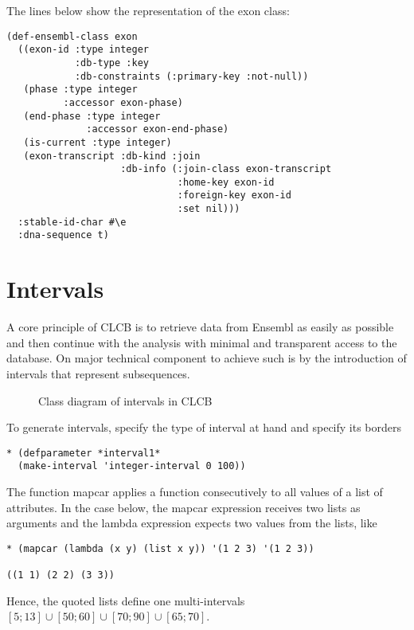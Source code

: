 \documentclass{book}
\newcommand\CLCB{CLCB }
\begin{document}
The lines below show the representation of the exon class:
\begin{lstlisting}
(def-ensembl-class exon
  ((exon-id :type integer
            :db-type :key
            :db-constraints (:primary-key :not-null))
   (phase :type integer
          :accessor exon-phase)
   (end-phase :type integer
              :accessor exon-end-phase)
   (is-current :type integer)
   (exon-transcript :db-kind :join
                    :db-info (:join-class exon-transcript
                              :home-key exon-id
                              :foreign-key exon-id
                              :set nil)))
  :stable-id-char #\e
  :dna-sequence t)
\end{lstlisting}

\section{Intervals}

A core principle of \CLCB is to retrieve data from Ensembl as easily as
possible and then continue with the analysis with minimal and transparent
access to the database. On major technical component to achieve such is
by the introduction of intervals that represent subsequences.

\begin{figure}
\begin{center}

\end{center}
\caption{Class diagram of intervals in \CLCB}
\end{figure}

To generate intervals, specify the type of interval at hand and specify its borders
\begin{lstlisting}
* (defparameter *interval1*
  (make-interval 'integer-interval 0 100))
\end{lstlisting}

The function mapcar applies a function consecutively to all values of a list of attributes. 
In the case below, the mapcar expression receives two lists as arguments and the lambda
expression expects two values from the lists, like
\begin{lstlisting}
* (mapcar (lambda (x y) (list x y)) '(1 2 3) '(1 2 3))

((1 1) (2 2) (3 3))
\end{lstlisting}

Hence, the quoted lists define one multi-intervals $[5;13]\cup[50;60]\cup[70;90]\cup[65;70]$.
\end{document}
